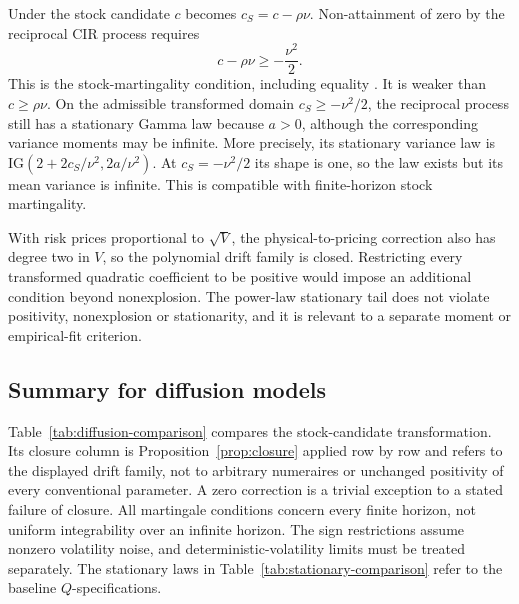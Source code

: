 \documentclass[11pt,a4paper]{article}
\theoremstyle{definition}
\theoremstyle{remark}
\begin{document}
Under the stock candidate \(c\) becomes \(c_S=c-\rho\nu\). Non-attainment of zero by the reciprocal CIR process requires
\begin{equation}
 c-\rho\nu\geq-\frac{\nu^2}{2}.
 \label{eq:threehalves-martingale}
\end{equation}
This is the stock-martingality condition, including equality \citep[Proposition~3.1]{BaldeauxBadran2014}. It is weaker than \(c\geq\rho\nu\). On the admissible transformed domain \(c_S\geq-\nu^2/2\), the reciprocal process still has a stationary Gamma law because \(a>0\), although the corresponding variance moments may be infinite. More precisely, its stationary variance law is \(\mathrm{IG}(2+2c_S/\nu^2,2a/\nu^2)\). At \(c_S=-\nu^2/2\) its shape is one, so the law exists but its mean variance is infinite. This is compatible with finite-horizon stock martingality.

With risk prices proportional to \(\sqrt V\), the physical-to-pricing correction also has degree two in \(V\), so the polynomial drift family is closed. Restricting every transformed quadratic coefficient to be positive would impose an additional condition beyond nonexplosion. The power-law stationary tail does not violate positivity, nonexplosion or stationarity, and it is relevant to a separate moment or empirical-fit criterion.

\subsection{Summary for diffusion models}

Table~\ref{tab:diffusion-comparison} compares the stock-candidate transformation. Its closure column is Proposition~\ref{prop:closure} applied row by row and refers to the displayed drift family, not to arbitrary numeraires or unchanged positivity of every conventional parameter. A zero correction is a trivial exception to a stated failure of closure. All martingale conditions concern every finite horizon, not uniform integrability over an infinite horizon. The sign restrictions assume nonzero volatility noise, and deterministic-volatility limits must be treated separately. The stationary laws in Table~\ref{tab:stationary-comparison} refer to the baseline \(Q\)-specifications.
\end{document}
